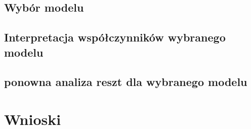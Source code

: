 \documentclass{article}
\begin{document}
\subsection{Wybór modelu}

\subsection{Interpretacja współczynników wybranego modelu}

\subsection{ponowna analiza reszt dla wybranego modelu}


\section{Wnioski}
\end{document}
